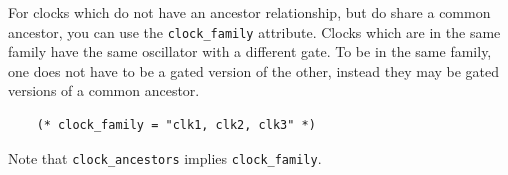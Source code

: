 \documentclass[twoside,letterpaper]{article}
\newcommand{\te}[1]{\texttt{#1}}
\begin{document}
For clocks which do not have an ancestor relationship, but do share a
common ancestor, you can use the \te{clock\_family} attribute. Clocks which are in
the same family have the same 
oscillator with a different gate. To be in the same family, one does
not have to be a gated version of the other, instead they may  be gated
versions of a common ancestor.

\begin{verbatim}
    (* clock_family = "clk1, clk2, clk3" *)
\end{verbatim}
   Note that
\te{clock\_ancestors} implies \te{clock\_family}.







\end{document}
